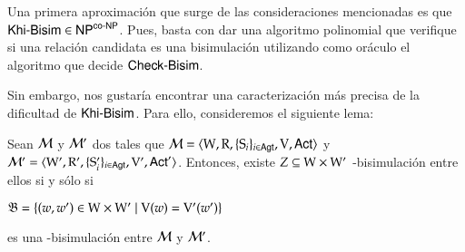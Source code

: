 Una primera aproximación que surge de las consideraciones mencionadas es que $\rm\textsf{Khi-Bisim} \in \rm\textsf{NP}^{\rm\textsf{co-NP}}$. Pues, basta con dar una 
algoritmo polinomial que verifique si una relación candidata es una bisimulación utilizando como oráculo el algoritmo que decide 
$\rm\textsf{Check-Bisim}$.

Sin embargo, nos gustaría encontrar una caracterización más precisa de la dificultad de $\rm\textsf{Khi-Bisim}$. Para ello, consideremos el siguiente 
lema:








\begin{lema}\label{lema:bisim-existence}
    Sean $\mathcal{M}$ y $\mathcal{M}'$ dos \ultss tales que 
    $\mathcal{M}=\langle \mathrm{W},\mathrm{R},\{ \mathrm{S}_i \}_{i \in {\rm \sf Agt}},\mathrm{V},{\rm \sf Act} \rangle$ y 
    $\mathcal{M}'=\langle \mathrm{W}',\mathrm{R}',\{ \mathrm{S}_i' \}_{i \in {\rm \sf Agt}},\mathrm{V}',{\rm \sf Act}' \rangle$.
    Entonces, existe $Z \subseteq \mathrm{W} \times \mathrm{W}'$ \KHilogic-bisimulación entre ellos si y sólo si

    \begin{center}
        $\mathfrak{B} = \{(w,w') \in \mathrm{W} \times \mathrm{W}' \mid \mathrm{V}(w) = \mathrm{V}'(w')\}$
    \end{center}
    es una \KHilogic-bisimulación entre $\mathcal{M}$ y $\mathcal{M}'$.
\end{lema}

